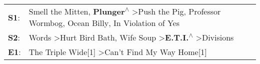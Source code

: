\begin{supertabular}{p{0.03\textwidth}p{0.92\textwidth}}
 \textbf{S1}:  &  Smell the Mitten\textsuperscript{}, \enspace \textbf{Plunger\textsuperscript{$\wedge$}} \textgreater \enspace Push the Pig\textsuperscript{}, \enspace Professor Wormbog\textsuperscript{}, \enspace Ocean Billy\textsuperscript{}, \enspace In Violation of Yes\textsuperscript{}  \enspace  \\
 \textbf{S2}:  &                                              Words\textsuperscript{} \textgreater \enspace Hurt Bird Bath\textsuperscript{}, \enspace Wife Soup\textsuperscript{} \textgreater \enspace \textbf{E.T.I.\textsuperscript{$\wedge$}} \textgreater \enspace Divisions\textsuperscript{}  \enspace  \\
 \textbf{E1}:  &                                                                                                                                                                              The Triple Wide[1]\textsuperscript{} \textgreater \enspace Can't Find My Way Home[1]\textsuperscript{}  \enspace  \\
\end{supertabular}
